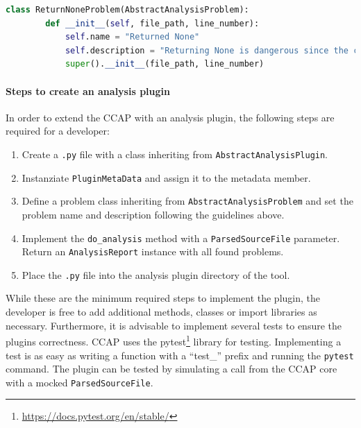 \begin{lstlisting}[language=Python, label=lst:return_none_problem_override, caption={Example for overwriting the \texttt{AbstractAnalysisProblem} with a specific implementation. The problem name and description are overwritten.}]
    class ReturnNoneProblem(AbstractAnalysisProblem):
        def __init__(self, file_path, line_number):
            self.name = "Returned None"
            self.description = "Returning None is dangerous since the caller has to check for None. Otherwise, a runtime exception may occur."
            super().__init__(file_path, line_number)
    \end{lstlisting}
    
\paragraph{Steps to create an analysis plugin}
In order to extend the CCAP with an analysis plugin, the following steps are required for a developer:
\begin{enumerate}
    \item Create a \texttt{.py} file with a class inheriting from \texttt{AbstractAnalysisPlugin}.
    \item Instanziate \texttt{PluginMetaData} and assign it to the metadata member.
    \item Define a problem class inheriting from \texttt{AbstractAnalysisProblem} and set the problem name and description following the guidelines above.
    \item Implement the \texttt{do\_analysis} method with a \texttt{ParsedSourceFile} parameter. Return an \texttt{AnalysisReport} instance with all found problems.
    \item Place the \texttt{.py} file into the analysis plugin directory of the tool.
\end{enumerate}
While these are the minimum required steps to implement the plugin, the developer is free to add additional methods, classes or import libraries as necessary.
Furthermore, it is advisable to implement several tests to ensure the plugins correctness. CCAP uses the pytest\footnote{\url{https://docs.pytest.org/en/stable/}} library for testing. Implementing a test is as easy as writing a function with a \enquote{test\_} prefix and running the \texttt{pytest} command. The plugin can be tested by simulating a call from the CCAP core with a mocked \texttt{ParsedSourceFile}. 

